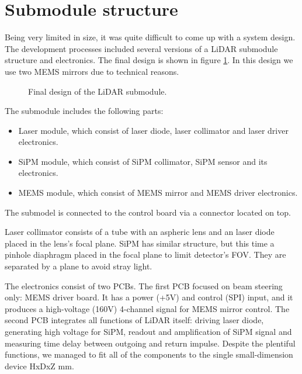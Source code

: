\section{Submodule structure}
Being very limited in size, it was quite difficult to come up with a system design. The development processes included several versions of a LiDAR submodule structure and electronics.
The final design is shown in figure \ref{fig:solid_sub}.
In this design we use two MEMS mirrors due to technical reasons. 

\begin{figure}[h]
\caption{Final design of the LiDAR submodule.}
\label{fig:solid_sub} 
\end{figure}

The submodule includes the following parts: 
\begin{itemize}
\item Laser module, which consist of laser diode, laser collimator and laser driver electronics.
\item SiPM module, which consist of SiPM collimator, SiPM sensor and its electronics.
\item MEMS module, which consist of MEMS mirror and MEMS driver electronics.
\end{itemize}

The submodel is connected to the control board via a connector located on top.

Laser collimator consists of a tube with an aspheric lens and an laser diode placed in the lens’s focal plane. SiPM has similar structure, but this time a pinhole diaphragm placed in the focal plane to limit detector's FOV. They are separated by a plane to avoid stray light.

The electronics consist of two PCBs. The first PCB focused on beam steering only: MEMS driver board. It has a power (+5V) and control (SPI) input, and it produces a high-voltage (160V) 4-channel signal for MEMS mirror control. The second PCB integrates all functions of LiDAR itself: driving laser diode, generating high voltage for SiPM, readout and amplification of SiPM signal and measuring time delay between outgoing and return impulse. Despite the plentiful functions, we managed to fit all of the components to the single small-dimension device HxDxZ mm.



